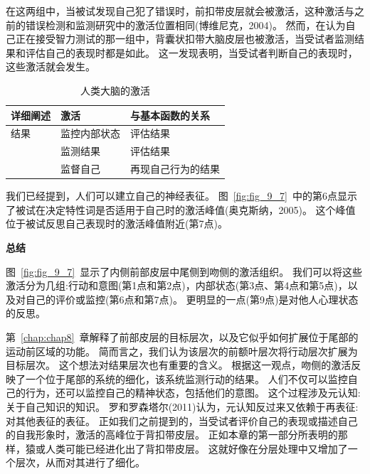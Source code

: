 在这两组中，当被试发现自己犯了错误时，前扣带皮层就会被激活，这种激活与之前的错误检测和监测研究中的激活位置相同(博维尼克，2004)。
然而，在认为自己正在接受智力测试的那一组中，背囊状扣带大脑皮层也被激活，当受试者监测结果和评估自己的表现时都是如此。
这一发现表明，当受试者判断自己的表现时，这些激活就会发生。
\par


\begin{table}[htbp] 
	\newcommand{\tabincell}[2]{\begin{tabular}{@{}#1@{}}#2\end{tabular}} %
	\centering
	\caption{人类大脑的激活\label{tab:9_5}}
	\renewcommand\arraystretch{1.5}	%
	\begin{tabular}{lll}
		\toprule
		详细阐述 & 激活 & 与基本函数的关系\\
		\midrule
		结果 & 监控内部状态 & 评估结果  \\
		& 监测结果 & 评估结果 \\
		& 监督自己 & 再现自己行为的结果 \\
		\bottomrule
		
	\end{tabular}%
\end{table}%


我们已经提到，人们可以建立自己的神经表征。
图~\ref{fig:fig_9_7}~中的第6点显示了被试在决定特性词是否适用于自己时的激活峰值(奥克斯纳，2005)。
这个峰值位于被试反思自己表现时的激活峰值附近(第7点)。
\par


\textbf{总结}
\par
图~\ref{fig:fig_9_7}~显示了内侧前部皮层中尾侧到吻侧的激活组织。
我们可以将这些激活分为几组:行动和意图(第1点和第2点)，内部状态(第3点、第4点和第5点)，以及对自己的评价或监控(第6点和第7点)。
更明显的一点(第9点)是对他人心理状态的反思。
\par


第~\ref{chap:chap8}~章解释了前部皮层的目标层次，以及它似乎如何扩展位于尾部的运动前区域的功能。
简而言之，我们认为该层次的前额叶层次将行动层次扩展为目标层次。
这个想法对结果层次也有重要的含义。
根据这一观点，吻侧的激活反映了一个位于尾部的系统的细化，该系统监测行动的结果。
人们不仅可以监控自己的行为，还可以监控自己的精神状态，包括他们的意图。
这个过程涉及元认知:关于自己知识的知识。
罗和罗森塔尔(2011)认为，元认知反过来又依赖于再表征:对其他表征的表征。
正如我们之前提到的，当受试者评价自己的表现或描述自己的自我形象时，激活的高峰位于背扣带皮层。
正如本章的第一部分所表明的那样，猿或人类可能已经进化出了背扣带皮层。
这就好像在分层处理中又增加了一个层次，从而对其进行了细化。



